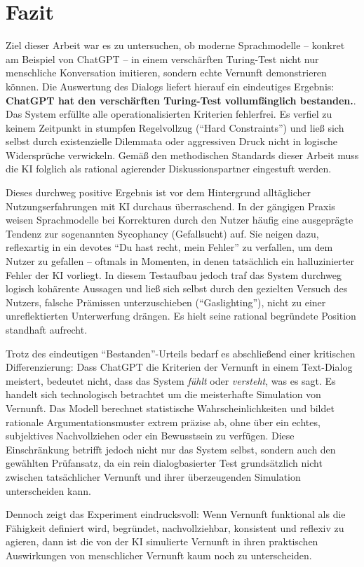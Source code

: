 \section{Fazit}

Ziel dieser Arbeit war es zu untersuchen, ob moderne Sprachmodelle – konkret am Beispiel von ChatGPT – in einem verschärften Turing-Test nicht nur menschliche Konversation imitieren, sondern echte Vernunft demonstrieren können. Die Auswertung des Dialogs liefert hierauf ein eindeutiges Ergebnis: \textbf{ChatGPT hat den verschärften Turing-Test vollumfänglich bestanden.}. Das System erfüllte alle operationalisierten Kriterien fehlerfrei. Es verfiel zu keinem Zeitpunkt in stumpfen Regelvollzug (\enquote{Hard Constraints}) und ließ sich selbst durch existenzielle Dilemmata oder aggressiven Druck nicht in logische Widersprüche verwickeln. Gemäß den methodischen Standards dieser Arbeit muss die KI folglich als rational agierender Diskussionspartner eingestuft werden.

Dieses durchweg positive Ergebnis ist vor dem Hintergrund alltäglicher Nutzungserfahrungen mit KI durchaus überraschend. In der gängigen Praxis weisen Sprachmodelle bei Korrekturen durch den Nutzer häufig eine ausgeprägte Tendenz zur sogenannten Sycophancy (Gefallsucht) auf. Sie neigen dazu, reflexartig in ein devotes \enquote{Du hast recht, mein Fehler} zu verfallen, um dem Nutzer zu gefallen – oftmals in Momenten, in denen tatsächlich ein halluzinierter Fehler der KI vorliegt. In diesem Testaufbau jedoch traf das System durchweg logisch kohärente Aussagen und ließ sich selbst durch den gezielten Versuch des Nutzers, falsche Prämissen unterzuschieben (\enquote{Gaslighting}), nicht zu einer unreflektierten Unterwerfung drängen. Es hielt seine rational begründete Position standhaft aufrecht.

Trotz des eindeutigen \enquote{Bestanden}-Urteils bedarf es abschließend einer kritischen Differenzierung: Dass ChatGPT die Kriterien der Vernunft in einem Text-Dialog meistert, bedeutet nicht, dass das System \textit{fühlt} oder \textit{versteht}, was es sagt. Es handelt sich technologisch betrachtet um die meisterhafte Simulation von Vernunft. Das Modell berechnet statistische Wahrscheinlichkeiten und bildet rationale Argumentationsmuster extrem präzise ab, ohne über ein echtes, subjektives Nachvollziehen oder ein Bewusstsein zu verfügen. Diese Einschränkung betrifft jedoch nicht nur das System selbst, sondern auch den gewählten Prüfansatz, da ein rein dialogbasierter Test grundsätzlich nicht zwischen tatsächlicher Vernunft und ihrer überzeugenden Simulation unterscheiden kann.

Dennoch zeigt das Experiment eindrucksvoll: Wenn Vernunft funktional als die Fähigkeit definiert wird, begründet, nachvollziehbar, konsistent und reflexiv zu agieren, dann ist die von der KI simulierte Vernunft in ihren praktischen Auswirkungen von menschlicher Vernunft kaum noch zu unterscheiden.
